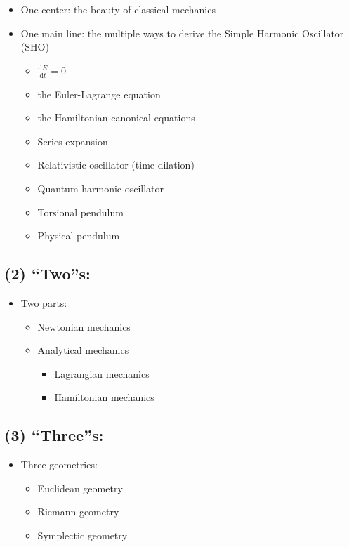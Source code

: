 \begin{itemize}
\tightlist{}
\item
  One center: the beauty of classical mechanics
\item
  One main line: the multiple ways to derive the Simple Harmonic
  Oscillator (SHO)

  \begin{itemize}
\tightlist{}
  \item
    \(\displaystyle \frac{\mathrm{d}E}{\mathrm{d}t} = 0\)
  \item
    the Euler-Lagrange equation
  \item
    the Hamiltonian canonical equations
  \item
    Series expansion
  \item
    Relativistic oscillator (time dilation)
  \item
    Quantum harmonic oscillator
  \item
    Torsional pendulum
  \item
    Physical pendulum
  \end{itemize}
\end{itemize}

\subsection*{(2) ``Two''s:}\label{twos}

\begin{itemize}
\tightlist{}
\item
  Two parts:

  \begin{itemize}
\tightlist{}
  \item
    Newtonian mechanics
  \item
    Analytical mechanics

    \begin{itemize}
\tightlist{}
    \item
      Lagrangian mechanics
    \item
      Hamiltonian mechanics
    \end{itemize}
  \end{itemize}
\end{itemize}

\subsection*{(3) ``Three''s:}\label{threes}

\begin{itemize}
\tightlist{}
\item
  Three geometries:

  \begin{itemize}
\tightlist{}
  \item
    Euclidean geometry
  \item
    Riemann geometry
  \item
    Symplectic geometry
  \end{itemize}
\end{itemize}

